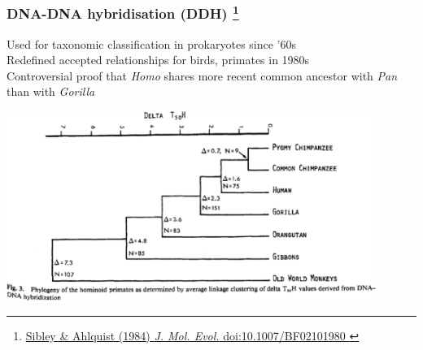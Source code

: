 %
\begin{frame}
  \frametitle{DNA-DNA hybridisation (DDH)
  \footnote{\tiny{\href{http://dx.doi.org/10.1007/BF02101980
}{Sibley \& Ahlquist (1984) \textit{J. Mol. Evol.} doi:10.1007/BF02101980
}}}  
  }
  Used for taxonomic classification in prokaryotes since '60s \\
  \textcolor{hutton_green}{Redefined accepted relationships for birds, primates in 1980s} \\
  \textcolor{RawSienna}{Controversial proof that \textit{Homo} shares more recent common ancestor with \textit{Pan} than with \textit{Gorilla}}
  \begin{center}
    \includegraphics[width=0.9\textwidth]{images/dna-dna_primates} \\
  \end{center}  
\end{frame}

